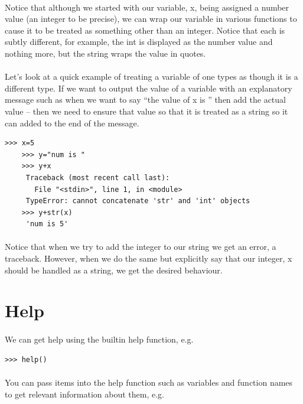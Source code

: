 \documentclass[12pt, a4paper, oneside]{book}
\begin{document}
{\paragraph{} Notice that although we started with our variable, x, being assigned a number value (an integer to be precise), we can wrap our variable in various functions to cause it to be treated as something other than an integer. Notice that each is subtly different, for example, the int is displayed as the number value and nothing more, but the string wraps the value in quotes.

\paragraph{} Let's look at a quick example of treating a variable of one types as though it is a different type. If we want to output the value of a variable with an explanatory message such as when we want to say ``the value of x is '' then add the actual value -- then we need to ensure that value so that it is treated as a string so it can added to the end of the message.

\begin{lstlisting}[style=DOS]
    >>> x=5
    >>> y="num is "
    >>> y+x
     Traceback (most recent call last):
       File "<stdin>", line 1, in <module>
     TypeError: cannot concatenate 'str' and 'int' objects
    >>> y+str(x)
     'num is 5'
\end{lstlisting}

\paragraph{} Notice that when we try to add the integer to our string we get an error, a traceback. However, when we do the same but explicitly say that our integer, x should be handled as a string, we get the desired behaviour.

\section{Help}
\label{help}
\paragraph{} We can get help using the builtin help function, e.g.

\begin{lstlisting}[style=DOS]
    >>> help()
\end{lstlisting}
\paragraph{} You can pass items into the help function such as variables and function names to get relevant information about them, e.g.

}
\end{document}
